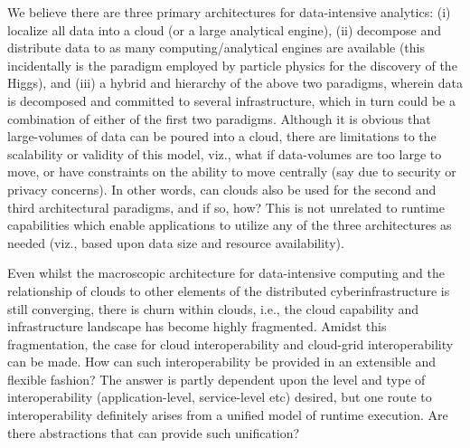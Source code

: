 \documentclass[times]{cpeauth}
\newcommand{\alnote}[1]{ {\textcolor{green} { ***andreL: #1 }}}
\newcommand{\alnote}[1]{}
\begin{document}
We believe there are three primary architectures for data-intensive
analytics: (i) localize all data into a cloud (or a large analytical
engine), (ii) decompose and distribute data to as many
computing/analytical engines are available (this incidentally is the
paradigm employed by particle physics for the discovery of the Higgs),
and (iii) a hybrid and hierarchy of the above two paradigms, wherein
data is decomposed and committed to several infrastructure, which in
turn could be a combination of either of the first two paradigms.
Although it is obvious that large-volumes of data can be poured into a
cloud, there are limitations to the scalability or validity of this
model, viz., what if data-volumes are too large to move, or have
constraints on the ability to move centrally (say due to security or
privacy concerns). In other words, can clouds also be used for the
second and third architectural paradigms, and if so,
how? %
This is not unrelated to runtime capabilities which enable applications
to utilize any of the three architectures as needed (viz., based upon
data size and resource availability).



Even whilst the macroscopic architecture for data-intensive computing
and the relationship of clouds to other elements of the distributed
cyberinfrastructure is still converging, there is churn within clouds,
i.e., the cloud capability and infrastructure landscape has become
highly fragmented. Amidst this fragmentation, 
the case for cloud interoperability and cloud-grid interoperability
can be made. %
How can such interoperability be provided in an extensible and
flexible fashion?  The answer is partly dependent upon the level and
type of interoperability (application-level, service-level etc)
desired, but one route to interoperability definitely arises from a
unified model of runtime execution.  Are there abstractions that can
provide such unification?
\end{document}
